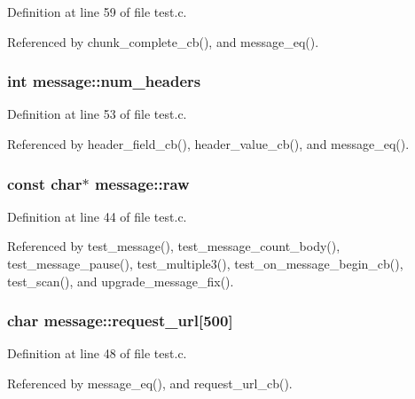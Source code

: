 Definition at line 59 of file test.\+c.



Referenced by chunk\+\_\+complete\+\_\+cb(), and message\+\_\+eq().

\subsubsection[{num\+\_\+headers}]{\setlength{\rightskip}{0pt plus 5cm}int message\+::num\+\_\+headers}\label{structmessage_aa7f22e44d0ea24ebe66b7e7a51c39463}


Definition at line 53 of file test.\+c.



Referenced by header\+\_\+field\+\_\+cb(), header\+\_\+value\+\_\+cb(), and message\+\_\+eq().

\subsubsection[{raw}]{\setlength{\rightskip}{0pt plus 5cm}const char$\ast$ message\+::raw}\label{structmessage_a7a9793f14df49d81233bdf5bb1004a65}


Definition at line 44 of file test.\+c.



Referenced by test\+\_\+message(), test\+\_\+message\+\_\+count\+\_\+body(), test\+\_\+message\+\_\+pause(), test\+\_\+multiple3(), test\+\_\+on\+\_\+message\+\_\+begin\+\_\+cb(), test\+\_\+scan(), and upgrade\+\_\+message\+\_\+fix().

\subsubsection[{request\+\_\+url}]{\setlength{\rightskip}{0pt plus 5cm}char message\+::request\+\_\+url[500]}\label{structmessage_aba795b8f4ad34457214936a1979d9c85}


Definition at line 48 of file test.\+c.



Referenced by message\+\_\+eq(), and request\+\_\+url\+\_\+cb().

